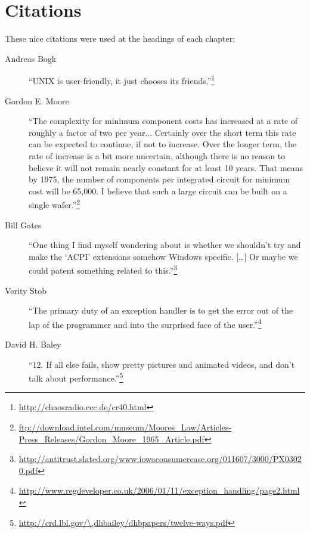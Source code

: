 \section*{Citations}
These nice citations were used at the headings of each chapter:
\begin{description}
\item[Andreas Bogk] ``UNIX is user-friendly, it just chooses its friends.''\footnote{\url{http://chaosradio.ccc.de/cr40.html}}
%
\item[Gordon E. Moore] ``The complexity for minimum component costs has increased at a rate of roughly a factor of two per year... Certainly over the short term this rate can be expected to continue, if not to increase. Over the longer term, the rate of increase is a bit more uncertain, although there is no reason to believe it will not remain nearly constant for at least 10 years. That means by 1975, the number of components per integrated circuit for minimum cost will be 65,000. I believe that such a large circuit can be built on a single wafer.''\footnote{\url{ftp://download.intel.com/museum/Moores_Law/Articles-Press_Releases/Gordon_Moore_1965_Article.pdf}}
%
\item[Bill Gates] ``One thing I find myself wondering about is whether we shouldn't try and make the `ACPI' extensions somehow Windows specific. [\dots] Or maybe we could patent something related to this.''\footnote{\url{http://antitrust.slated.org/www.iowaconsumercase.org/011607/3000/PX03020.pdf}}
%
\item[Verity Stob] ``The primary duty of an exception handler is to get the error out of the lap of the programmer and into the surprised face of the user.''\footnote{\url{http://www.regdeveloper.co.uk/2006/01/11/exception_handling/page2.html}}
%
\item[David H. Baley] ``12.  If all else fails, show pretty pictures and animated videos, and don't talk about performance.''\footnote{\url{http://crd.lbl.gov/\,dhbailey/dhbpapers/twelve-ways.pdf}}
\end{description}